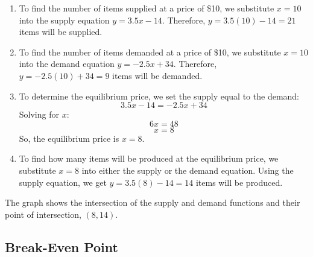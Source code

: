 \begin{solution}
\begin{enumerate}
  \item To find the number of items supplied at a price of \$10, we substitute $x = 10$ into the supply equation $y = 3.5x - 14$. Therefore, $y = 3.5(10) - 14 = 21$ items will be supplied.
  
  \item To find the number of items demanded at a price of \$10, we substitute $x = 10$ into the demand equation $y = -2.5x + 34$. Therefore, $y = -2.5(10) + 34 = 9$ items will be demanded.
  
  \item To determine the equilibrium price, we set the supply equal to the demand:
  \[3.5x - 14 = -2.5x + 34\]
  Solving for $x$:
  \[6x = 48\]
  \[x = 8\]
  So, the equilibrium price is $x = 8$.
  
  \item To find how many items will be produced at the equilibrium price, we substitute $x = 8$ into either the supply or the demand equation. Using the supply equation, we get $y = 3.5(8) - 14 = 14$ items will be produced.
\end{enumerate}

The graph shows the intersection of the supply and demand functions and their point of intersection, $(8, 14)$.


\begin{center}
\end{center}

\end{solution}

\subsection{Break-Even Point}

